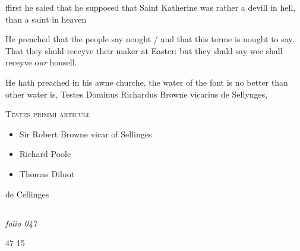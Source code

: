 \documentclass[12pt, a4paper]{book}
\begin{document}
				\marginpar[\vspace{0.5cm}{\textcolor{Gray}{Errour}}]{}
			
		\ifthenelse{\isodd{\thepage}}
		{\reversemarginpar}
		{\normalmarginpar}
		ffirst he saied that he supposed that Saint
 Katherine was rather a devill in hell, than
 a saint in heaven
               	
				\marginpar[\vspace{0.5cm}{\textcolor{Gray}{herecie n}}]{}
			
               		
		\ifthenelse{\isodd{\thepage}}
		{\reversemarginpar}
		{\normalmarginpar}
		He preached that the people say nought / and that
 this terme is nought to say. That they shuld
 receyve their maker at Easter: but they shuld
 say wee shall receyve o\textit{ur} housell.
               			
				\marginpar[\vspace{0.5cm}{\textcolor{Gray}{n}}]{}
			
		\ifthenelse{\isodd{\thepage}}
		{\reversemarginpar}
		{\normalmarginpar}
		He hath preached in his awne churche, the water
of the font is no better than other water is,
Testes Dominus Richardus Browne vicarius de Sellynges,

	\begin{center} {\scshape Testes primmi articuli.} \end{center}\begin{itemize}
		
		\item[]Sir Robert Browne vicar of Sellinges
		\item[]Richard Poole
		\item[]Thomas Dilnot
	\end{itemize}
	 de Cellinges



            
            
\dotfill
						\newpage {} \subsection*{}

\textit{folio 047}


\begin{flushright}{\color{Mahogany}47} 15\end{flushright}
 
\end{document}

